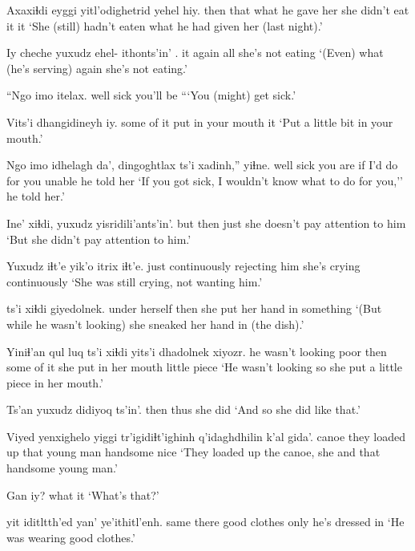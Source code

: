 \documentclass[12pt]{article}
\begin{document}
\gll Axaxiɬdi eyggi yitl'odighetrid {yehel} hiy.
then   that  {what he gave her} {she didn't eat it} it
\glt `She (still) hadn't eaten what he had given her (last night).'
\glend

\gll Iy cheche yuxudz ehel- {ithonts'in' }.
it again   all   {}    {she's not eating}
\glt `(Even) what (he's serving) again she's not eating.'
\glend

\gll ``Ngo imo  itelax.
well    sick {you'll be}
\glt ```You (might) get sick.'
\glend

\gll Vits'i dhangidineyh      iy.
{some of it}  {put in your mouth} it
\glt `Put a little bit in your mouth.'
\glend

\gll Ngo imo  idhelagh da', dingoghtlax {ts'i xadinh,''}             yiɬne.
well  sick {you are}  if  {I'd do for you} unable {he told her}
\glt `If you got sick, I wouldn't know what to do for you,'' he told her.'       
\glend

\gll Ine' xiɬdi, yuxudz {yisridili'ants'in'. }
but then just             {she doesn't pay attention to him}
\glt `But she didn't pay attention to him.'
\glend

\gll Yuxudz iɬt'e        yik'o       itrix        iɬt'e.
just            continuously {rejecting him} {she's crying} continuously
\glt `She was still crying, not wanting him.'
\glend

 ts'i xiɬdi giyedolnek.
{under herself}    {}  then     {she put her hand in something}
\glt `(But while he wasn't looking) she sneaked her hand in (the dish).'
\glend

 {Yiniɬ'an qul}      luq ts'i xiɬdi yits'i dhadolnek               xiyozr.
{} {he wasn't looking} poor {}  then  {some of it} {she put in her mouth} {little piece}
\glt `He wasn't looking so she put a little piece in her mouth.'
\glend

\gll Ts'an yuxudz didiyoq ts'in'.
then  thus   {she did }
\glt `And so she did like that.'
\glend

\gll Viyed yenxighelo      yiggi tr'igidiɬt'ighinh q'idaghdhilin k'al     gida'.
canoe {they loaded up}  that    {}            {young man}  handsome nice
\glt `They loaded up the canoe, she and that handsome young man.'
\glend

\gll Gan  iy?
what it
\glt `What's that?'
\glend

 yit iditltth'ed yan' {ye'ithitl'enh}.
same     there  {good clothes}       only {he's dressed in}
\glt `He was wearing good clothes.'
\glend
\end{document}
